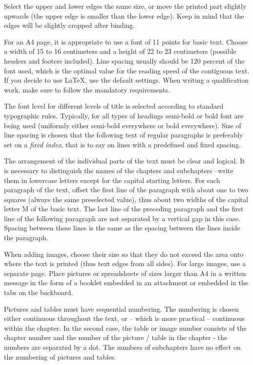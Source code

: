 Select the upper and lower edges the same size, or move the printed part slightly upwards (the upper edge is smaller than the lower edge). Keep in mind that the edges will be slightly cropped after binding.

For an A4 page, it is appropriate to use a font of 11 points for basic text. Choose a width of 15 to 16 centimeters and a height of 22 to 23 centimeters (possible headers and footers included). Line spacing usually should be 120 percent of the font used, which is the optimal value for the reading speed of the contiguous text. If you decide to use LaTeX, use the default settings. When writing a qualification work, make sure to follow the mandatory requirements.

The font level for different levels of title is selected according to standard typographic rules. 
Typically, for all types of headings semi-bold or bold font are being used (uniformly either semi-bold everywhere or bold everywhere). Size of line spacing is chosen that the following text of regular paragraphs is preferably set on a {\it fixed index}, that is to say on lines with a predefined and fixed spacing.

The arrangement of the individual parts of the text must be clear and logical. It is necessary to distinguish the names of the chapters and subchapters --write them in lowercase letters except for the capital starting letters. For each paragraph of the text, offset the first line of the paragraph with about one to two squares (always the same preselected value), thus about two widths of the capital letter M of the basic text. The last line of the preceding paragraph and the first line of the following paragraph are not separated by a vertical gap in this case. Spacing between these lines is the same as the spacing between the lines inside the paragraph.

When adding images, choose their size so that they do not exceed the area onto where the text is printed (thus text edges from all sides). For large images, use a separate page. Place pictures or spreadsheets of sizes larger than A4 in a written message in the form of a booklet embedded in an attachment or embedded in the tabs on the backboard.

Pictures and tables must have sequential numbering. The numbering is chosen either continuous throughout the text, or -- which is more practical -- continuous within the chapter. In the second case, the table or image number consists of the chapter number and the number of the picture / table in the chapter - the numbers are separated by a dot. The numbers of subchapters have no effect on the numbering of pictures and tables.

